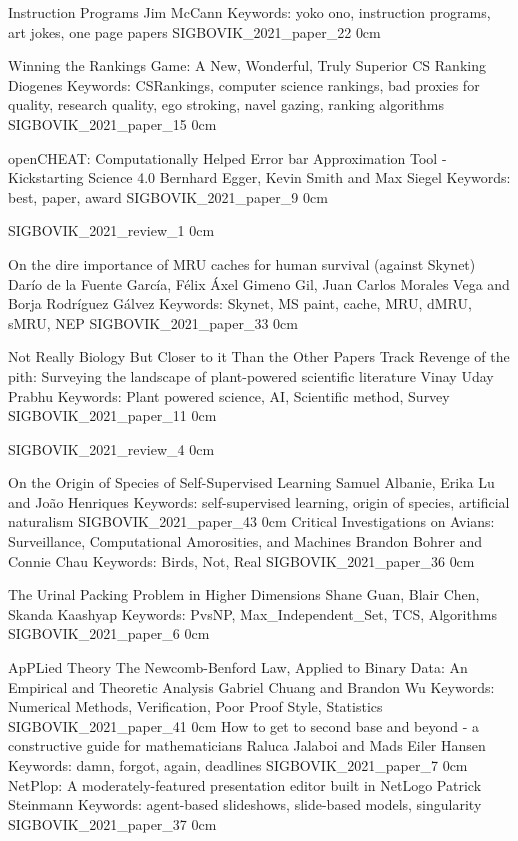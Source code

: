 \addpaper
    {Instruction Programs}
    {Jim McCann}
    {Keywords: yoko ono, instruction programs, art jokes, one page papers}
    {SIGBOVIK_2021_paper_22}
    {0cm}
    {}

\addpaper
    {Winning the Rankings Game: A New, Wonderful, Truly Superior CS Ranking}
    {Diogenes}
    {Keywords: CSRankings, computer science rankings, bad proxies for quality, research quality, ego stroking, navel gazing, ranking algorithms}
    {SIGBOVIK_2021_paper_15}
    {0cm}
    {}

\addpaper
    {openCHEAT: Computationally Helped Error bar Approximation Tool - Kickstarting Science 4.0}
    {Bernhard Egger, Kevin Smith and Max Siegel} %
    {Keywords: best, paper, award}
    {SIGBOVIK_2021_paper_9}
    {0cm}
    {}


\addreview
    {SIGBOVIK_2021_review_1}
    {0cm}


\addpaper
    {On the dire importance of MRU caches for human survival (against Skynet)}
    {Darío de la Fuente García, Félix Áxel Gimeno Gil, Juan Carlos Morales Vega and Borja Rodríguez Gálvez}
    {Keywords: Skynet, MS paint, cache, MRU, dMRU, sMRU, NEP}
    {SIGBOVIK_2021_paper_33}
    {0cm}
    {}


\addtrack
    {}{Not Really Biology But Closer to it Than the Other Papers Track}
\addpaper
    {Revenge of the pith: Surveying the landscape of plant-powered scientific literature}
    {Vinay Uday Prabhu}
    {Keywords: Plant powered science, AI, Scientific method, Survey}
    {SIGBOVIK_2021_paper_11}
    {0cm}
    {}

\addreview
    {SIGBOVIK_2021_review_4}
    {0cm}


\addpaper
    {On the Origin of Species of Self-Supervised Learning}
    {Samuel Albanie, Erika Lu and João Henriques}
    {Keywords: self-supervised learning, origin of species, artificial naturalism}
    {SIGBOVIK_2021_paper_43}
    {0cm}
    {}
\addpaper
    {Critical Investigations on Avians: Surveillance, Computational Amorosities, and Machines}
    {Brandon Bohrer and Connie Chau}
    {Keywords: Birds, Not, Real}
    {SIGBOVIK_2021_paper_36}
    {0cm}
    {}

\addpaper
    {The Urinal Packing Problem in Higher Dimensions}
    {Shane Guan, Blair Chen, Skanda Kaashyap}
    {Keywords: PvsNP, Max\_Independent\_Set, TCS, Algorithms}
    {SIGBOVIK_2021_paper_6}
    {0cm}
    {}

\addtrack
    {}{ApPLied Theory}
\addpaper
    {The Newcomb-Benford Law, Applied to Binary Data: An Empirical and Theoretic Analysis}
    {Gabriel Chuang and Brandon Wu}
    {Keywords: Numerical Methods, Verification, Poor Proof Style, Statistics}
    {SIGBOVIK_2021_paper_41}
    {0cm}
    {}
\addpaper
    {How to get to second base and beyond - a constructive guide for mathematicians}
    {Raluca Jalaboi and Mads Eiler Hansen}
    {Keywords: damn, forgot, again, deadlines}
    {SIGBOVIK_2021_paper_7}
    {0cm}
    {}
\addpaper
    {NetPlop: A moderately-featured presentation editor built in NetLogo}
    {Patrick Steinmann}
    {Keywords: agent-based slideshows, slide-based models, singularity}
    {SIGBOVIK_2021_paper_37}
    {0cm}
    {}

